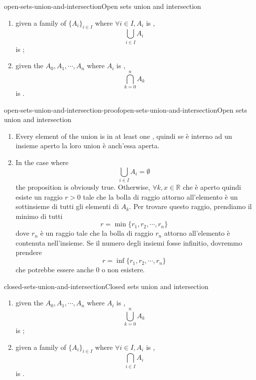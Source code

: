 \documentclass[preview]{standalone}
\begin{document}
\begin{snippetproposition}{open-sets-union-and-intersection}{Open sets union and intersection}
    \begin{enumerate}
        \item given a family of \set[sets] \({\{A_i\}}_{i\in I}\) where \(\forall i \in I, A_i\)
        is ,
        \[
            \bigcup_{i \in I} A_i
        \]
        is ;
        \item given the \set[sets] \(A_0, A_1, \cdots, A_n\) where \(A_i\)
        is ,
        \[
            \bigcap_{k=0}^n A_k
        \]
        is .
    \end{enumerate}
\end{snippetproposition}

\begin{snippetproof}{open-sets-union-and-intersection-proof}{open-sets-union-and-intersection}{Open sets union and intersection}
    \begin{enumerate}
        \item Every element of the union is in at least one , quindi se è interno
        ad un insieme aperto la loro union è anch'essa aperta.
        \item In the case where
        \[
            \bigcup_{i \in I} A_i = \emptyset
        \]
        the proposition is obviously true.
        Otherwise, \(\forall k, x \in \mathbb{R}\) che è aperto quindi
        esiste un raggio \(r > 0\) tale che la bolla di raggio attorno all'elemento è un sottinsieme di
        tutti gli elementi di \(A_k\). Per trovare questo raggio, prendiamo il minimo di tutti
        \[
            r = \min\{ r_1, r_2, \cdots, r_n \}
        \]
        dove \(r_n\) è un raggio tale che la bolla di raggio \(r_n\) attorno all'elemento
        è contenuta nell'insieme.
        Se il numero degli insiemi fosse infinitio, dovremmo prendere
        \[
            r = \inf\{ r_1, r_2, \cdots, r_n \}
        \]
        che potrebbe essere anche \(0\) o non esistere.
    \end{enumerate}
\end{snippetproof}

\begin{snippetproposition}{closed-sets-union-and-intersection}{Closed sets union and intersection}
    \begin{enumerate}
        \item given the \set[sets] \(A_0, A_1, \cdots, A_n\) where \(A_i\)
        is \closedset[closed],
        \[
            \bigcup_{k=0}^n A_k
        \]
        is \closedset[closed];
        \item given a family of \set[sets] \({\{A_i\}}_{i\in I}\) where \(\forall i \in I, A_i\)
        is \closedset[closed],
        \[
            \bigcap_{i \in I} A_i
        \]
        is \closedset[closed].
    \end{enumerate}
\end{snippetproposition}
\end{document}
